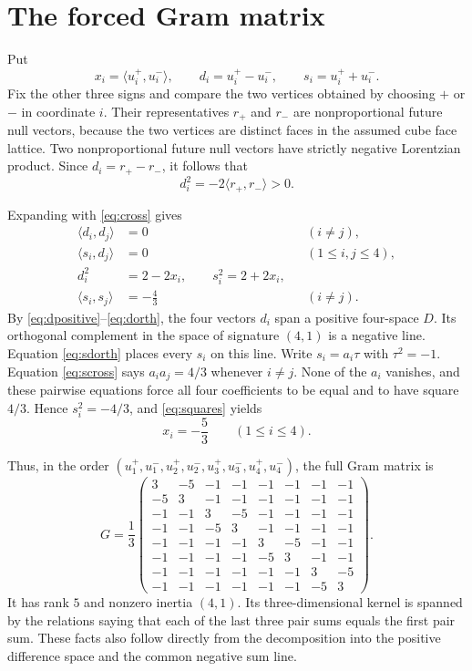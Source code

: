 \documentclass[11pt]{article}
\begin{document}
\section{The forced Gram matrix}

Put
\[
 x_i=\langle u_i^+,u_i^-\rangle,\qquad
 d_i=u_i^+-u_i^-,\qquad s_i=u_i^++u_i^-.
\]
Fix the other three signs and compare the two vertices obtained by
choosing $+$ or $-$ in coordinate $i$.  Their representatives $r_+$
and $r_-$ are nonproportional future null vectors, because the two
vertices are distinct faces in the assumed cube face lattice.  Two
nonproportional future null vectors have strictly negative Lorentzian
product.  Since $d_i=r_+-r_-$, it follows that
\begin{equation}\label{eq:dpositive}
 d_i^2=-2\langle r_+,r_-\rangle>0.
\end{equation}

Expanding with \eqref{eq:cross} gives
\begin{align}
 \langle d_i,d_j\rangle&=0 &&(i\ne j),\label{eq:dorth}\\
 \langle s_i,d_j\rangle&=0 &&(1\leq i,j\leq4),\label{eq:sdorth}\\
 d_i^2&=2-2x_i,\qquad s_i^2=2+2x_i,\label{eq:squares}\\
 \langle s_i,s_j\rangle&=-\frac43 &&(i\ne j).\label{eq:scross}
\end{align}
By \eqref{eq:dpositive}--\eqref{eq:dorth}, the four vectors $d_i$
span a positive four-space $D$.  Its orthogonal complement in the
space of signature $(4,1)$ is a negative line.  Equation
\eqref{eq:sdorth} places every $s_i$ on this line.  Write
$s_i=a_i\tau$ with $\tau^2=-1$.  Equation \eqref{eq:scross} says
$a_i a_j=4/3$ whenever $i\ne j$.  None of the $a_i$ vanishes, and these
pairwise equations force all four coefficients to be equal and to have
square $4/3$.  Hence $s_i^2=-4/3$, and \eqref{eq:squares} yields
\begin{equation}\label{eq:opposite}
 x_i=-\frac53\qquad(1\leq i\leq4).
\end{equation}

Thus, in the order
$(u_1^+,u_1^-,u_2^+,u_2^-,u_3^+,u_3^-,u_4^+,u_4^-)$, the full Gram
matrix is
\begin{equation}\label{eq:fullgram}
G=\frac13\begin{pmatrix}
 3&-5&-1&-1&-1&-1&-1&-1\\
-5& 3&-1&-1&-1&-1&-1&-1\\
-1&-1& 3&-5&-1&-1&-1&-1\\
-1&-1&-5& 3&-1&-1&-1&-1\\
-1&-1&-1&-1& 3&-5&-1&-1\\
-1&-1&-1&-1&-5& 3&-1&-1\\
-1&-1&-1&-1&-1&-1& 3&-5\\
-1&-1&-1&-1&-1&-1&-5& 3
\end{pmatrix}.
\end{equation}
It has rank $5$ and nonzero inertia $(4,1)$.  Its three-dimensional
kernel is spanned by the relations saying that each of the last three
pair sums equals the first pair sum.  These facts also follow directly
from the decomposition into the positive difference space and the
common negative sum line.
\end{document}
